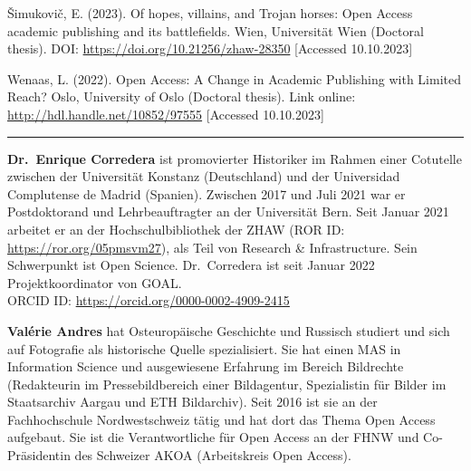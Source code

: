 \documentclass[a4paper,
fontsize=11pt,
oneside,
numbers=noperiodatend,
parskip=half-,
bibliography=totoc,
final
]{scrartcl}
\begin{document}
Šimukovič, E. (2023). Of hopes, villains, and Trojan horses: Open Access
academic publishing and its battlefields. Wien, Universität Wien
(Doctoral thesis). DOI: \url{https://doi.org/10.21256/zhaw-28350}
{[}Accessed 10.10.2023{]}

Wenaas, L. (2022). Open Access: A Change in Academic Publishing with
Limited Reach? Oslo, University of Oslo (Doctoral thesis). Link online:
\url{http://hdl.handle.net/10852/97555} {[}Accessed 10.10.2023{]}

\begin{center}\rule{0.5\linewidth}{0.5pt}\end{center}

\textbf{Dr.~Enrique Corredera} ist promovierter Historiker im Rahmen
einer Cotutelle zwischen der Universität Konstanz (Deutschland) und der
Universidad Complutense de Madrid (Spanien). Zwischen 2017 und Juli 2021
war er Postdoktorand und Lehrbeauftragter an der Universität Bern. Seit
Januar 2021 arbeitet er an der Hochschulbibliothek der ZHAW (ROR ID:
\url{https://ror.org/05pmsvm27}), als Teil von Research \&
Infrastructure. Sein Schwerpunkt ist Open Science. Dr.~Corredera ist
seit Januar 2022 Projektkoordinator von GOAL. \\
ORCID ID: \url{https://orcid.org/0000-0002-4909-2415}

\textbf{Valérie Andres} hat Osteuropäische Geschichte und Russisch
studiert und sich auf Fotografie als historische Quelle spezialisiert.
Sie hat einen MAS in Information Science und ausgewiesene Erfahrung im
Bereich Bildrechte (Redakteurin im Pressebildbereich einer Bildagentur,
Spezialistin für Bilder im Staatsarchiv Aargau und ETH Bildarchiv). Seit
2016 ist sie an der Fachhochschule Nordwestschweiz tätig und hat dort
das Thema Open Access aufgebaut. Sie ist die Verantwortliche für Open
Access an der FHNW und Co-Präsidentin des Schweizer AKOA (Arbeitskreis
Open Access).
\end{document}
